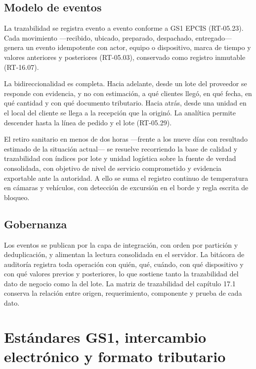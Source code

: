 \subsection{Modelo de eventos}

La trazabilidad se registra evento a evento conforme a GS1 EPCIS (RT-05.23).
Cada movimiento ---recibido, ubicado, preparado, despachado, entregado---
genera un evento idempotente con actor, equipo o dispositivo, marca de tiempo y
valores anteriores y posteriores (RT-05.03), conservado como registro inmutable
(RT-16.07).

La bidireccionalidad es completa.  Hacia adelante, desde un lote del proveedor
se responde con evidencia, y no con estimación, a qué clientes llegó, en qué
fecha, en qué cantidad y con qué documento tributario.  Hacia atrás, desde una
unidad en el local del cliente se llega a la recepción que la originó.  La
analítica permite descender hasta la línea de pedido y el lote (RT-05.29).

El retiro sanitario en menos de dos horas ---frente a los nueve días con
resultado estimado de la situación actual--- se resuelve recorriendo la base de
calidad y trazabilidad con índices por lote y unidad logística sobre la fuente
de verdad consolidada, con objetivo de nivel de servicio comprometido y
evidencia exportable ante la autoridad.  A ello se suma el registro continuo de
temperatura en cámaras y vehículos, con detección de excursión en el borde y
regla escrita de bloqueo.

\subsection{Gobernanza}

Los eventos se publican por la capa de integración, con orden por partición y
deduplicación, y alimentan la lectura consolidada en el servidor.  La bitácora
de auditoría registra toda operación con quién, qué, cuándo, con qué
dispositivo y con qué valores previos y posteriores, lo que sostiene tanto la
trazabilidad del dato de negocio como la del lote.  La matriz de trazabilidad
del capítulo 17.1 conserva la relación entre origen, requerimiento, componente
y prueba de cada dato.

\section{Estándares GS1, intercambio electrónico y formato tributario}
\label{sec:estandares}


